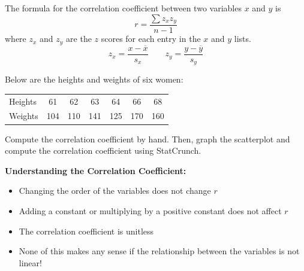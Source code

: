 \documentclass[../mathNotesPreamble]{subfiles}
\begin{document}
  \begin{defn*}
    The formula for the correlation coefficient between two variables $x$ and $y$ is
      \[r=\dfrac{\sum z_xz_y}{n-1}\]
    where $z_x$ and $z_y$ are the $z$ scores for each entry in the $x$ and $y$ lists.
      \[z_x=\dfrac{x-\overline{x}}{s_x} \qquad z_y=\dfrac{y-\overline{y}}{s_y}\]
  \end{defn*}
  \begin{ex*}
    Below are the heights and weights of six women:
    \begin{center}
      \begin{tabular}{@{}l*{6}{c}@{}}\toprule
        Heights& 61& 62& 63& 64& 66& 68\\
        Weights& 104& 110& 141& 125& 170& 160\\\bottomrule
      \end{tabular}
    \end{center}
    Compute the correlation coefficient by hand. Then, graph the scatterplot and compute the correlation coefficient using StatCrunch.
  \end{ex*}
  \begin{flushright}
  \end{flushright}
  \pagebreak
  
  \noindent\textbf{Understanding the Correlation Coefficient:}
  \begin{itemize}
    \item Changing the order of the variables does not change $r$
    \item Adding a constant or multiplying by a positive constant does not affect $r$
    \item The correlation coefficient is unitless
    \item None of this makes any sense if the relationship between the variables is not linear!
  \end{itemize}

  \pagebreak
\end{document}

